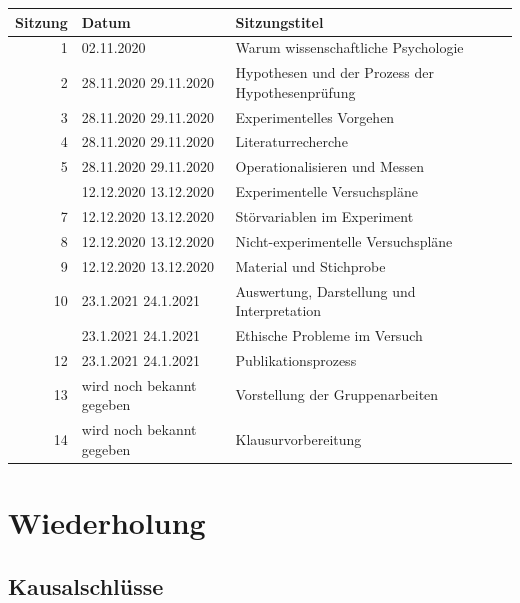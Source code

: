 \documentclass[
]{book}
\begin{document}
\begin{tabular}[t]{rll}
\toprule
Sitzung & Datum & Sitzungstitel\\
\midrule
1 & 02.11.2020 & Warum wissenschaftliche Psychologie\\
2 & 28.11.2020
29.11.2020 & Hypothesen und der Prozess der Hypothesenprüfung\\
3 & 28.11.2020
29.11.2020 & Experimentelles Vorgehen\\
4 & 28.11.2020
29.11.2020 & Literaturrecherche\\
5 & 28.11.2020
29.11.2020 & Operationalisieren und Messen\\
\addlinespace
6 & 12.12.2020
13.12.2020 & Experimentelle Versuchspläne\\
7 & 12.12.2020
13.12.2020 & Störvariablen im Experiment\\
8 & 12.12.2020
13.12.2020 & Nicht-experimentelle Versuchspläne\\
9 & 12.12.2020
13.12.2020 & Material und Stichprobe\\
10 & 23.1.2021
24.1.2021 & Auswertung, Darstellung und Interpretation\\
\addlinespace
11 & 23.1.2021
24.1.2021 & Ethische Probleme im Versuch\\
12 & 23.1.2021
24.1.2021 & Publikationsprozess\\
13 & wird noch bekannt gegeben & Vorstellung der Gruppenarbeiten\\
14 & wird noch bekannt gegeben & Klausurvorbereitung\\
\bottomrule
\end{tabular}

\hypertarget{wiederholung-2}{%
\section{Wiederholung}\label{wiederholung-2}}

\hypertarget{kausalschluxfcsse}{%
\subsection{Kausalschlüsse}\label{kausalschluxfcsse}}
\end{document}
